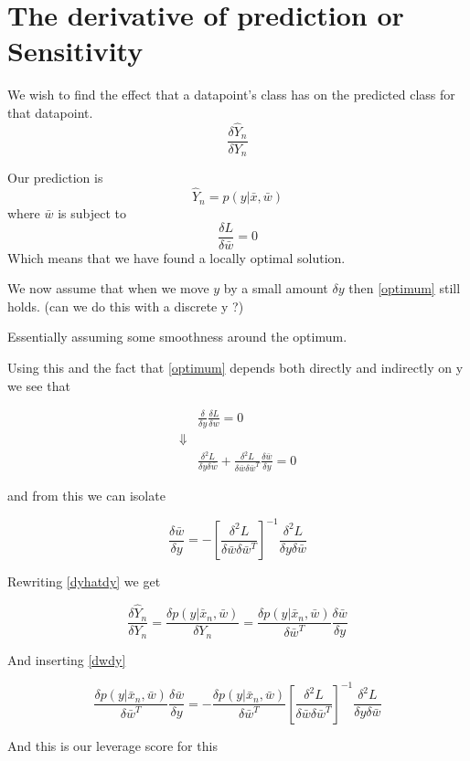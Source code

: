 
\section{The derivative of prediction or Sensitivity}
We wish to find the effect that a datapoint's class has on the predicted class for that datapoint.
\begin{equation}
\label{dyhatdy}
\frac{\delta \hat{Y}_n}{\delta Y_n}
\end{equation}

Our prediction is 
\begin{equation}
 \hat{Y}_n = p(y|\bar{x},\bar{w})
\end{equation}
where $\bar{w}$ is subject to 
\begin{equation}
\label{optimum}
\frac{\delta L}{\delta\bar{w}}=0
\end{equation}
Which means that we have found a locally optimal solution.

We now assume that when we move $y$ by a small amount $\delta y$ then \ref{optimum} still holds. (can we do this with a discrete y ?)

Essentially assuming some smoothness around the optimum.

Using this and the fact that \ref{optimum} depends both directly and indirectly on y we see that

\begin{eqnarray*}
&\frac{\delta}{\delta y} \frac{\delta L}{\delta w} = 0\\
\Downarrow & \\
&\frac{\delta^2 L}{\delta y \delta \bar{w}} + \frac{\delta^2 L}{\delta \bar{w} \delta \bar{w}^T} \frac{\delta \bar{w}}{\delta y}= 0
\end{eqnarray*}

and from this we can isolate

\begin{equation}
\label{dwdy}
\frac{\delta \bar{w}}{\delta y} = - \left[ \frac{\delta^2 L}{\delta \bar{w} \delta \bar{w}^T} \right]^{-1} \frac{\delta^2 L}{\delta y \delta \bar{w}} 
\end{equation}

Rewriting \eqref{dyhatdy} we get

\begin{equation}
\frac{\delta \hat{Y}_n}{\delta Y_n} = \frac{\delta p(y|\bar{x}_n,\bar{w})}{\delta Y_n} =  \frac{\delta p(y|\bar{x}_n,\bar{w})}{\delta \bar{w}^T} \frac{\delta \bar{w}}{\delta y}
\end{equation}

And inserting \eqref{dwdy} 

\begin{equation}
\frac{\delta p(y|\bar{x}_n,\bar{w})}{\delta \bar{w}^T} \frac{\delta \bar{w}}{\delta y} = - \frac{\delta p(y|\bar{x}_n,\bar{w})}{\delta \bar{w}^T} \left[ \frac{\delta^2 L}{\delta \bar{w} \delta \bar{w}^T} \right]^{-1} \frac{\delta^2 L}{\delta y \delta \bar{w}}
\end{equation}

And this is our leverage score for this 



